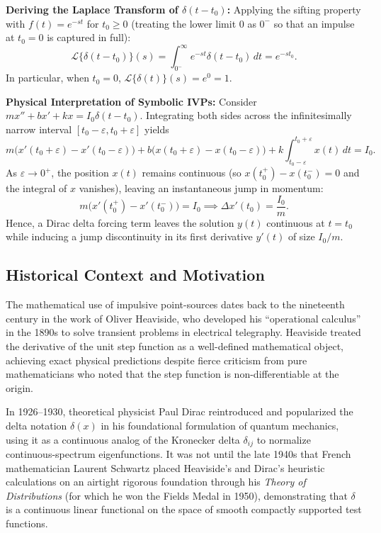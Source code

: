\documentclass[11pt, letterpaper]{article}
\theoremstyle{definition}
\theoremstyle{remark}
\begin{document}
\textbf{Deriving the Laplace Transform of $\delta(t - t_0)$:} Applying the sifting property with $f(t) = e^{-st}$ for $t_0 \ge 0$ (treating the lower limit $0$ as $0^-$ so that an impulse at $t_0 = 0$ is captured in full):
\[
    \mathcal{L}\{\delta(t - t_0)\}(s) = \int_{0^-}^{\infty} e^{-st}\delta(t - t_0)\,dt = e^{-st_0}.
\]
In particular, when $t_0 = 0$, $\mathcal{L}\{\delta(t)\}(s) = e^0 = 1$.

\textbf{Physical Interpretation of Symbolic IVPs:} Consider $m x'' + b x' + k x = I_0 \delta(t - t_0)$. Integrating both sides across the infinitesimally narrow interval $[t_0 - \varepsilon, t_0 + \varepsilon]$ yields
\[
    m\bigl(x'(t_0 + \varepsilon) - x'(t_0 - \varepsilon)\bigr) + b\bigl(x(t_0 + \varepsilon) - x(t_0 - \varepsilon)\bigr) + k\int_{t_0-\varepsilon}^{t_0+\varepsilon} x(t)\,dt = I_0.
\]
As $\varepsilon \to 0^+$, the position $x(t)$ remains continuous (so $x(t_0^+) - x(t_0^-) = 0$ and the integral of $x$ vanishes), leaving an instantaneous jump in momentum:
\[
    m\bigl(x'(t_0^+) - x'(t_0^-)\bigr) = I_0 \implies \Delta x'(t_0) = \frac{I_0}{m}.
\]
Hence, a Dirac delta forcing term leaves the solution $y(t)$ continuous at $t = t_0$ while inducing a jump discontinuity in its first derivative $y'(t)$ of size $I_0 / m$.

\subsection{Historical Context and Motivation}
The mathematical use of impulsive point-sources dates back to the nineteenth century in the work of Oliver Heaviside, who developed his ``operational calculus'' in the 1890s to solve transient problems in electrical telegraphy. Heaviside treated the derivative of the unit step function as a well-defined mathematical object, achieving exact physical predictions despite fierce criticism from pure mathematicians who noted that the step function is non-differentiable at the origin.

In 1926--1930, theoretical physicist Paul Dirac reintroduced and popularized the delta notation $\delta(x)$ in his foundational formulation of quantum mechanics, using it as a continuous analog of the Kronecker delta $\delta_{ij}$ to normalize continuous-spectrum eigenfunctions. It was not until the late 1940s that French mathematician Laurent Schwartz placed Heaviside's and Dirac's heuristic calculations on an airtight rigorous foundation through his \emph{Theory of Distributions} (for which he won the Fields Medal in 1950), demonstrating that $\delta$ is a continuous linear functional on the space of smooth compactly supported test functions.
\end{document}
